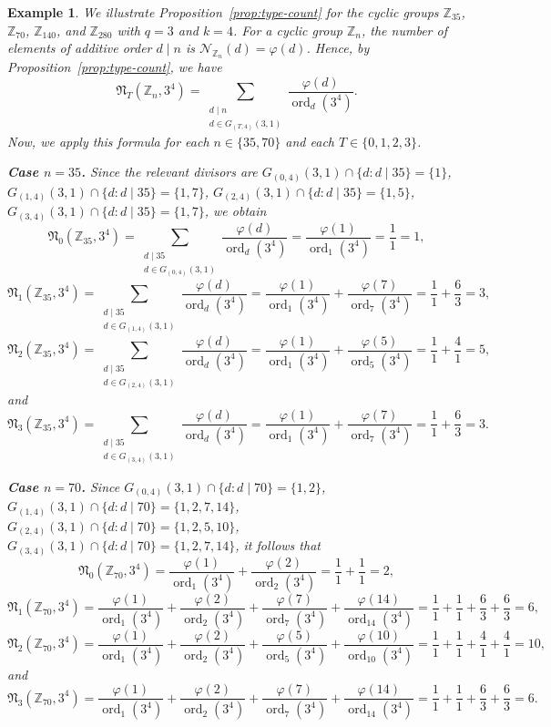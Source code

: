 \documentclass[pdflatex,sn-mathphys-num]{sn-jnl}%
\theoremstyle{thmstyleone}%
\theoremstyle{thmstyletwo}%
\newtheorem{example}{Example}%
\theoremstyle{thmstylethree}%
\newcommand{\Z}{\mathbb{Z}}
\newcommand{\ord}{\operatorname{ord}}
\begin{document}
 \begin{example}\label{ex:enumeration-35}
We illustrate Proposition~\ref{prop:type-count} for the cyclic groups $
\Z_{35}$, $\Z_{70}$,   $\Z_{140}$,    and  $\Z_{280}$ 
with $q=3$ and $k=4$. For a cyclic group $\Z_n$, the number of elements of additive order $d\mid n$ is $
\mathcal{N}_{\Z_n}(d)=\varphi(d)$.
Hence, by Proposition~\ref{prop:type-count}, we have 
\[
\mathfrak N_T(\Z_n,3^4)
=
\sum_{\substack{d\mid n\\ d\in G_{(T,4)}(3,1)}}
\frac{\varphi(d)}{\ord_d(3^4)}.
\]
Now, we apply this formula for each $n\in\{35,70\}$ and each $T\in\{0,1,2,3\}$.

\medskip
\noindent
\textbf{Case $n=35$.}
Since the relevant divisors are
$
G_{(0,4)}(3,1)\cap\{d:d\mid 35\}=\{1\}$, $
G_{(1,4)}(3,1)\cap\{d:d\mid 35\}=\{1,7\}$, $
G_{(2,4)}(3,1)\cap\{d:d\mid 35\}=\{1,5\}$, $
G_{(3,4)}(3,1)\cap\{d:d\mid 35\}=\{1,7\}$,
we obtain
\[
\mathfrak N_0(\Z_{35},3^4)
=
\sum_{\substack{d\mid 35\\ d\in G_{(0,4)}(3,1)}}
\frac{\varphi(d)}{\ord_d(3^4)}
=
\frac{\varphi(1)}{\ord_1(3^4)}
=
\frac{1}{1}
=
1,
\]
\[
\mathfrak N_1(\Z_{35},3^4)
=
\sum_{\substack{d\mid 35\\ d\in G_{(1,4)}(3,1)}}
\frac{\varphi(d)}{\ord_d(3^4)}
=
\frac{\varphi(1)}{\ord_1(3^4)}
+\frac{\varphi(7)}{\ord_7(3^4)}
=
\frac{1}{1}+\frac{6}{3}
=
3,
\]
\[
\mathfrak N_2(\Z_{35},3^4)
=
\sum_{\substack{d\mid 35\\ d\in G_{(2,4)}(3,1)}}
\frac{\varphi(d)}{\ord_d(3^4)}
=
\frac{\varphi(1)}{\ord_1(3^4)}
+\frac{\varphi(5)}{\ord_5(3^4)}
=
\frac{1}{1}+\frac{4}{1}
=
5,
\] and 
\[
\mathfrak N_3(\Z_{35},3^4)
=
\sum_{\substack{d\mid 35\\ d\in G_{(3,4)}(3,1)}}
\frac{\varphi(d)}{\ord_d(3^4)}
=
\frac{\varphi(1)}{\ord_1(3^4)}
+\frac{\varphi(7)}{\ord_7(3^4)}
=
\frac{1}{1}+\frac{6}{3}
=
3.
\]

\medskip
\noindent
\textbf{Case $n=70$.}
Since
$
G_{(0,4)}(3,1)\cap\{d:d\mid 70\}=\{1,2\}$,
$
G_{(1,4)}(3,1)\cap\{d:d\mid 70\}=\{1,2,7,14\}$,
$
G_{(2,4)}(3,1)\cap\{d:d\mid 70\}=\{1,2,5,10\}$, $
G_{(3,4)}(3,1)\cap\{d:d\mid 70\}=\{1,2,7,14\}$,
it follows that 
\[
\mathfrak N_0(\Z_{70},3^4)
=
\frac{\varphi(1)}{\ord_1(3^4)}
+\frac{\varphi(2)}{\ord_2(3^4)}
=
\frac{1}{1}+\frac{1}{1}
=
2,
\]
\[
\mathfrak N_1(\Z_{70},3^4)
=
\frac{\varphi(1)}{\ord_1(3^4)}
+\frac{\varphi(2)}{\ord_2(3^4)}
+\frac{\varphi(7)}{\ord_7(3^4)}
+\frac{\varphi(14)}{\ord_{14}(3^4)}
=
\frac{1}{1}+\frac{1}{1}+\frac{6}{3}+\frac{6}{3}
=
6,
\]
\[
\mathfrak N_2(\Z_{70},3^4)
=
\frac{\varphi(1)}{\ord_1(3^4)}
+\frac{\varphi(2)}{\ord_2(3^4)}
+\frac{\varphi(5)}{\ord_5(3^4)}
+\frac{\varphi(10)}{\ord_{10}(3^4)}
=
\frac{1}{1}+\frac{1}{1}+\frac{4}{1}+\frac{4}{1}
=
10,
\]
and 
\[
\mathfrak N_3(\Z_{70},3^4)
=
\frac{\varphi(1)}{\ord_1(3^4)}
+\frac{\varphi(2)}{\ord_2(3^4)}
+\frac{\varphi(7)}{\ord_7(3^4)}
+\frac{\varphi(14)}{\ord_{14}(3^4)}
=
\frac{1}{1}+\frac{1}{1}+\frac{6}{3}+\frac{6}{3}
=
6.
\]
 

\end{example}
\end{document}
